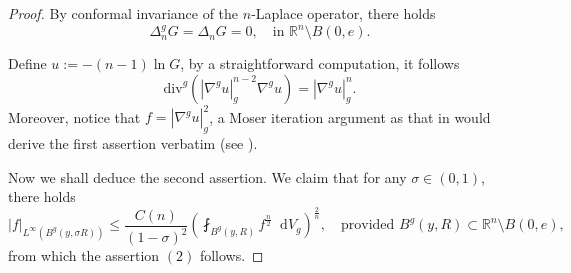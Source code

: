 \documentclass[12pt]{amsart}
\theoremstyle{plain}
\theoremstyle{definition}
\theoremstyle{remark}     %
\numberwithin{equation}{section}
\newcommand{\dd}{\mathop{}\!\mathrm{d}}%
\newcommand{\nablag}{\nabla^g} %
\begin{document}
\begin{proof}
    By conformal invariance of the $n$-Laplace operator, there holds
    \[
        \Delta_n^g G=\Delta_n G=0,\quad \text{in } \mathbb{R}^n\setminus B(0,e).
    \]

    Define $u:=-(n-1)\ln G$, by a straightforward computation, it follows
    \[
        \mathrm{div}^g(|\nablag u|_g^{n-2}\nablag u)=|\nablag u|_g^n.
    \]
    Moreover, notice that $f=|\nabla^g u|_g^2$,  a Moser iteration argument as that in \cite[Theorem 1.1]{WZ} would derive the first assertion   verbatim (see \cite[(2.18)]{WZ}). 

    Now we shall deduce the second assertion.
    We claim that for any $\sigma\in (0,1)$, there holds
    \[
        |f|_{L^{\infty}(B^g(y,\sigma R))}\leq 
        \frac{C(n)}{(1-\sigma)^2}
        \left(
            \fint_{B^g(y,R)}f^{\frac{n}{2}}\dd V_g
            \right)^{\frac{2}{n}},
            \quad \text{provided } B^g(y,R)\subset \mathbb{R}^n\setminus B(0,e),
    \]
    from which the assertion $(2)$ follows.


\end{proof}
\end{document}
